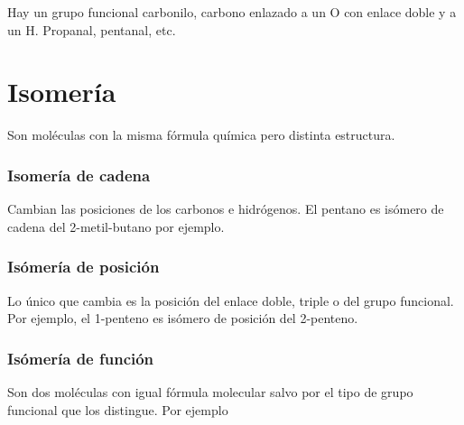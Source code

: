 Hay un grupo funcional carbonilo, carbono enlazado a un O con enlace doble y a un H. Propanal, pentanal, etc.


\section*{Isomería}

Son moléculas con la misma fórmula química pero distinta estructura.


\subsubsection*{Isomería de cadena}

Cambian las posiciones de los carbonos e hidrógenos. El pentano es isómero de cadena del 2-metil-butano por ejemplo.


\subsubsection*{Isómería de posición}

Lo único que cambia es la posición del enlace doble, triple o del grupo funcional. Por ejemplo, el 1-penteno es isómero de posición del 2-penteno.


\subsubsection*{Isómería de función}

Son dos moléculas con igual fórmula molecular salvo por el tipo de grupo funcional que los distingue. Por ejemplo 